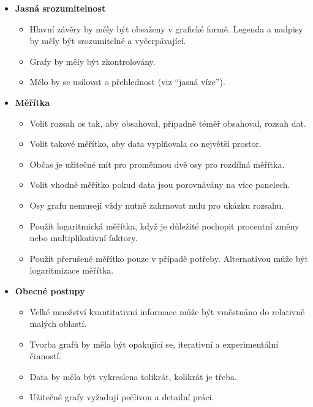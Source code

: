 \documentclass[12pt,]{article}
\providecommand{\tightlist}{%
  \setlength{\itemsep}{0pt}\setlength{\parskip}{0pt}}
\begin{document}
\begin{itemize}
\tightlist
\item
  \textbf{Jasná srozumitelnost}

  \begin{itemize}
  \tightlist
  \item
    Hlavní závěry by měly být obsaženy v grafické formě. Legenda a
    nadpisy by měly být srozumitelné a vyčerpávající.
  \item
    Grafy by měly být zkontrolovány.
  \item
    Mělo by se usilovat o přehlednost (viz \enquote{jasná víze}).
  \end{itemize}
\end{itemize}

\newpage

\begin{itemize}
\tightlist
\item
  \textbf{Měřítka}

  \begin{itemize}
  \tightlist
  \item
    Volit rozsah os tak, aby obsahoval, případně téměř obsahoval, rozsah
    dat.
  \item
    Volit takové měřítko, aby data vyplňovala co největší prostor.
  \item
    Občas je užitečné mít pro proměnnou dvě osy pro rozdílná měřítka.
  \item
    Volit vhodné měřítko pokud data jsou porovnávány na více panelech.
  \item
    Osy grafu nemusejí vždy nutně zahrnovat nulu pro ukázku rozsahu.
  \item
    Použít logaritmická měřítka, když je důležité pochopit procentní
    změny nebo multiplikativní faktory.
  \item
    Použít přerušené měřítko pouze v případě potřeby. Alternativou může
    být logaritmizace měřítka.
  \end{itemize}
\item
  \textbf{Obecné postupy}

  \begin{itemize}
  \tightlist
  \item
    Velké množství kvantitativní informace může být vměstnáno do
    relativně malých oblastí.
  \item
    Tvorba grafů by měla být opakující se, iterativní a experimentální
    činností.
  \item
    Data by měla být vykreslena tolikrát, kolikrát je třeba.
  \item
    Užitečné grafy vyžadují pečlivou a detailní práci.
  \end{itemize}
\end{itemize}
\end{document}
